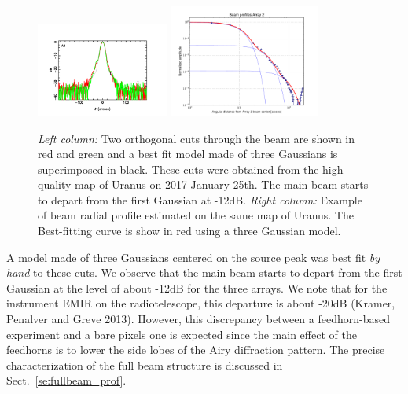 \begin{figure}[ht!]
\begin{center}
    \includegraphics[clip=true, width=0.39\textwidth]{Figures/Array_A2_dB.pdf}
    \includegraphics[clip=true, trim={-0.5cm, -0.65cm, 0, 0}, width=0.44\textwidth]{Figures/Beam_profiles_A2_FR.pdf}
    \caption[Beam structure]{\emph{Left column:} Two orthogonal cuts through the
      beam are shown in red and green and a best fit model made of three
      Gaussians is superimposed in black.
      These cuts were obtained from the high quality map of Uranus on 2017
      January 25th. The main beam starts to depart from the first Gaussian
      at -12dB. \emph{Right column:} Example of beam radial profile
      estimated on the same map of Uranus. The Best-fitting curve is show
      in red using a three Gaussian model.   
    }
    \label{fig:beam_structure_example}
  \end{center}
\end{figure}

A model made of three Gaussians centered on the source peak was best
fit {\it by hand} to these cuts.
We observe that the main beam starts to depart from the first
Gaussian at the level of about -12dB for the three arrays.
We note that for the instrument EMIR on the radiotelescope,
this departure is about -20dB (Kramer, Penalver and Greve
2013). However, this
discrepancy between a feedhorn-based experiment and a bare pixels one
is expected since the main effect of the feedhorns is to lower the
side lobes of the Airy diffraction pattern.
The precise characterization of the full beam structure is discussed
in Sect.~\ref{se:fullbeam_prof}.  

